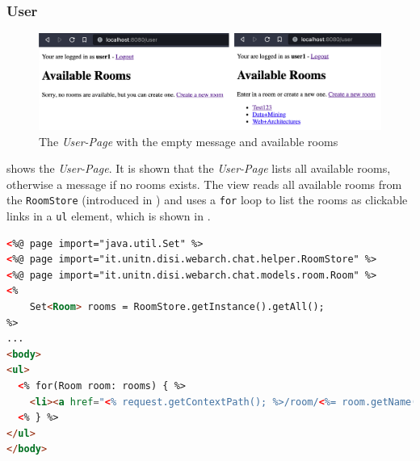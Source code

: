 \subsubsection{User}\label{subsubsec:03_impl_servlets_user}
\begin{figure}[h]
\centering
\includegraphics[scale=0.2]{images/03_impl/user/userpage_before_after}
\caption{The \textit{User-Page} with the empty message and available rooms}
\label{fig:03_impl_servlets_user_beforeafter}
\end{figure}
 shows the \textit{User-Page}. It is shown that the \textit{User-Page} lists all available rooms, otherwise a message if no rooms exists.
The view reads all available rooms from the \texttt{RoomStore} (introduced in ) and uses a \texttt{for} loop to list the rooms as clickable links in a \texttt{ul} element, which is shown in .
\newpage
\begin{lstlisting}[label=lst:03_impl_servlets_user, caption=List all available rooms, language=html]
<%@ page import="java.util.Set" %>
<%@ page import="it.unitn.disi.webarch.chat.helper.RoomStore" %>
<%@ page import="it.unitn.disi.webarch.chat.models.room.Room" %>
<%
    Set<Room> rooms = RoomStore.getInstance().getAll();
%>
...
<body>
<ul>
  <% for(Room room: rooms) { %>
    <li><a href="<% request.getContextPath(); %>/room/<%= room.getName() %>"><%= room.getName() %></a></li>
  <% } %>
</ul>
</body>
\end{lstlisting}


